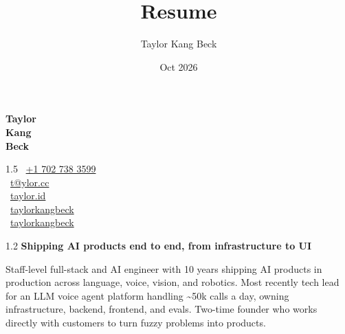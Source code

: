 \documentclass{my_cv}
\title{Resume}
\author{Taylor Kang Beck}
\date{Oct 2026}
\newcommand{\socialicon}[1]{\raisebox{-0.05em}{#1}}
\begin{document}

\noindent
\begin{minipage}[t]{0.19\textwidth}
    \vspace{0pt}
    {\Huge \textbf{Taylor \\ Kang \\ Beck}}
\end{minipage}%
\hfill
\begin{minipage}[t]{0.22\textwidth}
    \vspace{0pt}
    \begin{spacing}{1.5}
    \socialicon{\faPhone}~\href{tel:7027383599}{+1 702 738 3599} \\
    \socialicon{\faEnvelope}~\href{mailto:t@ylor.cc}{t@ylor.cc} \\
    \socialicon{\faGlobe}~\href{https://www.taylor.id}{taylor.id} \\
    \socialicon{\faGithub}~\href{https://github.com/taylorkangbeck}{taylorkangbeck} \\
    \socialicon{\faLinkedin}~\href{https://www.linkedin.com/in/taylorkangbeck/}{taylorkangbeck}
    \end{spacing}
\end{minipage}%
\hfill
\begin{minipage}[t]{0.53\textwidth}
    \vspace{0pt}
    \begin{spacing}{1.2}
        \noindent\textbf{Shipping AI products end to end, from infrastructure to UI}\par
        \vspace{0.3em}
        \noindent Staff-level full-stack and AI engineer with 10 years shipping AI products in production across language, voice, vision, and robotics. Most recently tech lead for an LLM voice agent platform handling \textasciitilde50k calls a day, owning infrastructure, backend, frontend, and evals. Two-time founder who works directly with customers to turn fuzzy problems into products.
    \end{spacing}
\end{minipage}


\end{document}

